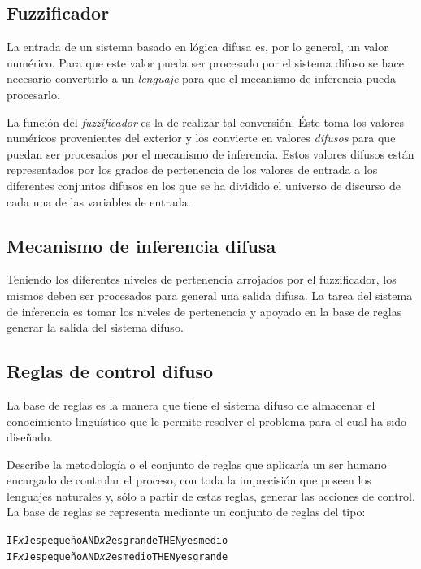 \subsection{Fuzzificador}


La entrada de un sistema basado en lógica difusa es, por lo general, un valor numérico. Para que este valor pueda ser procesado por el sistema difuso se hace necesario convertirlo a un \textit{lenguaje}  para que el mecanismo de inferencia pueda procesarlo. 

La función del \textit{fuzzificador} es la de realizar tal conversión. Éste toma los valores numéricos provenientes del exterior y los convierte en valores \textit{difusos} para que puedan ser procesados por el mecanismo de inferencia. Estos valores difusos están representados por los grados de pertenencia de los valores de entrada a los diferentes conjuntos difusos en los que se ha dividido el universo de discurso de cada una de las variables de entrada.


\subsection{Mecanismo de inferencia difusa}


Teniendo los diferentes niveles de pertenencia arrojados por el fuzzificador, los mismos deben ser procesados para general una salida difusa. La tarea del sistema de inferencia es tomar los niveles de pertenencia y apoyado en la base de reglas generar la salida del sistema difuso.


\subsection{Reglas de control difuso}


La base de reglas es la manera que tiene el sistema difuso de almacenar el conocimiento lingüístico que le permite resolver el problema para el cual ha sido diseñado.

Describe la metodología o el conjunto de reglas que aplicaría un ser humano encargado de controlar el proceso, con toda la imprecisión que poseen los lenguajes naturales y, sólo a partir de estas reglas, generar las acciones de control. La base de reglas se representa mediante un conjunto de reglas del tipo:

\begin{center}
\begin{alltt}
IF \textit{x1} es pequeño AND \textit{x2} es grande THEN \textit{y} es medio 
IF \textit{x1} es pequeño AND \textit{x2} es medio THEN \textit{y} es grande 
\end{alltt}
\end{center} 

